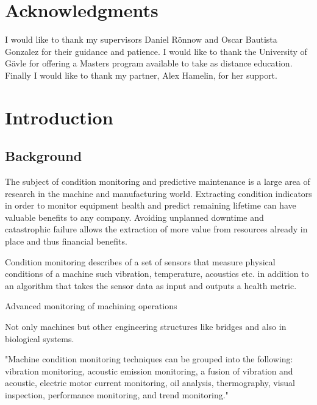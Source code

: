\documentclass{article}
\begin{document}
\section{Acknowledgments}
I would like to thank my supervisors Daniel Rönnow and Oscar Bautista Gonzalez for their guidance and patience.
I would like to thank the University of Gävle for offering a Masters program available to take as distance education.
Finally I would like to thank my partner, Alex Hamelin, for her support.
\newpage

\pagestyle{plain}

\section{Introduction}
\subsection{Background}
The subject of condition monitoring and predictive maintenance is a large area of research in the machine and manufacturing world. Extracting condition indicators in order to monitor equipment health and predict remaining lifetime can have valuable benefits to any company. Avoiding unplanned downtime and catastrophic failure allows the extraction of more value from resources already in place and thus financial benefits.

Condition monitoring describes of a set of sensors that measure physical conditions of a machine such vibration, temperature, acoustics etc. in addition to an algorithm that takes the sensor data as input and outputs a health metric.

Advanced monitoring of machining operations~\cite{teti2010advanced}

Not only machines but other engineering structures like bridges and also in biological systems.

"Machine condition monitoring techniques can be grouped into the following: vibration monitoring, acoustic emission monitoring, a fusion of vibration and acoustic, electric motor current monitoring, oil analysis, thermography, visual inspection, performance monitoring, and trend monitoring."
\end{document}
